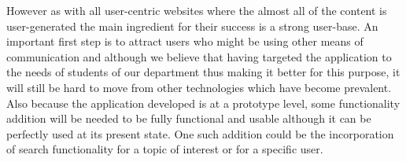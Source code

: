 \documentclass[12pt,a4paper,titlepage]{article}
\begin{document}
However as with all user-centric websites where the almost all of the content is user-generated the main ingredient for their success is a strong user-base. An important first step is to attract users who might be using other means of communication and although we believe that having targeted the application to the needs of students of our department thus making it better for this purpose, it will still be hard to move from other technologies which have become prevalent. Also because the application developed is at a prototype level, some functionality addition will be needed to be fully functional and usable although it can be perfectly used at its present state. One such addition could be the incorporation of search functionality for a topic of interest or for a specific user.
\end{document}
